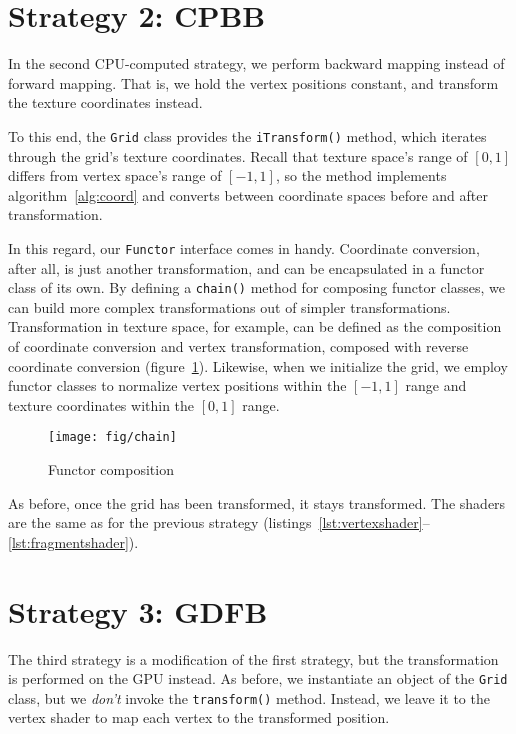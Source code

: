 \documentclass[english,12pt]{ifimaster}
\begin{document}
\section{Strategy 2: CPBB}
\label{sec:implementationcpbb}

In the second CPU-computed strategy, we perform backward mapping
instead of forward mapping. That is, we hold the vertex positions
constant, and transform the texture coordinates instead.

To this end, the \lstinline|Grid| class provides the
\lstinline|iTransform()| method, which iterates through the grid's
texture coordinates. Recall that texture space's range of $[0, 1]$
differs from vertex space's range of $[-1, 1]$, so the method
implements algorithm~\ref{alg:coord} and converts between coordinate
spaces before and after transformation.

In this regard, our \lstinline|Functor| interface comes in handy.
Coordinate conversion, after all, is just another transformation, and
can be encapsulated in a functor class of its own. By defining a
\lstinline|chain()| method for composing functor classes, we can build
more complex transformations out of simpler transformations.
Transformation in texture space, for example, can be defined as the
composition of coordinate conversion and vertex transformation,
composed with reverse coordinate conversion (figure~\ref{fig:chain}).
Likewise, when we initialize the grid, we employ functor classes to
normalize vertex positions within the $[-1, 1]$ range and texture
coordinates within the $[0, 1]$ range.

\begin{figure}
  \centering
  \texttt{[image: fig/chain]}
  \caption{Functor composition}
  \label{fig:chain}
\end{figure}

As before, once the grid has been transformed, it stays transformed.
The shaders are the same as for the previous strategy
(listings~\ref{lst:vertexshader}--\ref{lst:fragmentshader}).

\section{Strategy 3: GDFB}

The third strategy is a modification of the first strategy, but the
transformation is performed on the GPU instead. As before, we
instantiate an object of the \lstinline|Grid| class, but we
\emph{don't} invoke the \lstinline|transform()| method. Instead, we
leave it to the vertex shader to map each vertex to the transformed
position.
\end{document}

